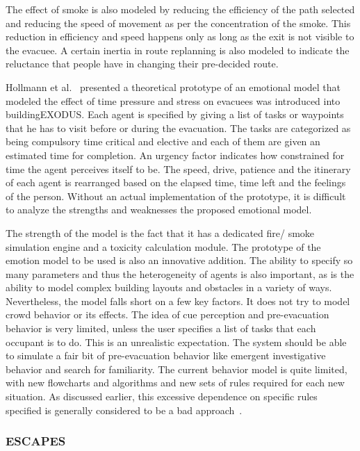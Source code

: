 The effect of smoke is also modeled by reducing the efficiency of the path selected and reducing the speed of movement as per the concentration of the smoke. This reduction in efficiency and speed happens only as long as the exit is not visible to the evacuee. A certain inertia in route replanning is also modeled to indicate the reluctance that people have in changing their pre-decided route.

Hollmann et al.~\cite{Hollmann:2010vy} presented a theoretical prototype of an emotional model that modeled the effect of time pressure and stress on evacuees was introduced into buildingEXODUS. Each agent is specified by giving a list of tasks or waypoints that he has to visit before or during the evacuation. The tasks are categorized as being compulsory time critical and elective and each of them are given an estimated time for completion. An urgency factor indicates how constrained for time the agent perceives itself to be. The speed, drive, patience and the itinerary of each agent is rearranged based on the elapsed time, time left and the feelings of the person. Without an actual implementation of the prototype, it is difficult to analyze the strengths and weaknesses the proposed emotional model.

The strength of the model is the fact that it has a dedicated fire/ smoke simulation engine and a toxicity calculation module. The prototype of the emotion model to be used is also an innovative addition. The ability to specify so many parameters and thus the heterogeneity of agents is also important, as is the ability to model complex building layouts and obstacles in a variety of ways. Nevertheless, the model falls short on a few key factors. It does not try to model crowd behavior or its effects. The idea of cue perception and pre-evacuation behavior is very limited, unless the user specifies a list of tasks that each occupant is to do. This is an unrealistic expectation. The system should be able to simulate a fair bit of pre-evacuation behavior like emergent investigative behavior and search for familiarity. The current behavior model is quite limited, with new flowcharts and algorithms and new sets of rules required for each new situation. As discussed earlier, this excessive dependence on specific rules specified is generally considered to be a bad approach~\cite{Still:2000tp}.

\subsubsection{ESCAPES}

